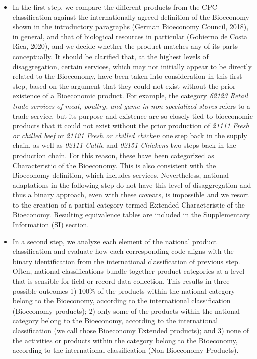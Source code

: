 \documentclass[
  letterpaper,
  DIV=11,
  numbers=noendperiod]{scrartcl}
\begin{document}
\begin{itemize}
\item
  In the first step, we compare the different products from the CPC
  classification against the internationally agreed definition of the
  Bioeconomy shown in the introductory paragraphs (German Bioeconomy
  Council, 2018), in general, and that of biological resources in
  particular (Gobierno de Costa Rica, 2020), and we decide whether the
  product matches any of its parts conceptually. It should be clarified
  that, at the highest levels of disaggregation, certain services, which
  may not initially appear to be directly related to the Bioeconomy,
  have been taken into consideration in this first step, based on the
  argument that they could not exist without the prior existence of a
  Bioeconomic product. For example, the category \emph{62123 Retail
  trade services of meat, poultry, and game in non-specialized stores}
  refers to a trade service, but its purpose and existence are so
  closely tied to bioeconomic products that it could not exist without
  the prior production of \emph{21111 Fresh or chilled beef} or
  \emph{21121 Fresh or chilled chicken} one step back in the supply
  chain, as well as \emph{02111 Cattle} and \emph{02151 Chickens} two
  steps back in the production chain. For this reason, these have been
  categorized as Characteristic of the Bioeconomy. This is also
  consistent with the Bioeconomy definition, which includes services.
  Nevertheless, national adaptations in the following step do not have
  this level of disaggregation and thus a binary approach, even with
  these caveats, is impossible and we resort to the creation of a
  partial category termed Extended Characteristic of the Bioeconomy.
  Resulting equivalence tables are included in the Supplementary
  Information (SI) section.
\item
  In a second step, we analyze each element of the national product
  classification and evaluate how each corresponding code aligns with
  the binary identification from the international classification of
  previous step. Often, national classifications bundle together product
  categories at a level that is sensible for field or record data
  collection. This results in three possible outcomes 1) 100\% of the
  products within the national category belong to the Bioeconomy,
  according to the international classification (Bioeconomy products);
  2) only some of the products within the national category belong to
  the Bioeconomy, according to the international classification (we call
  those Bioeconomy Extended products); and 3) none of the activities or
  products within the category belong to the Bioeconomy, according to
  the international classification (Non-Bioeconomy Products).
\end{itemize}
\end{document}
